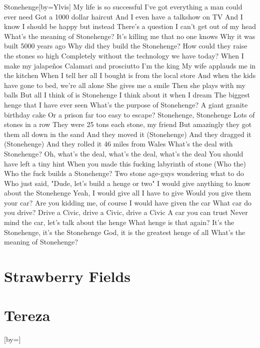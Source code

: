 \documentclass{article}
\begin{document}
\begin{songs}{}
\begin{song}{Stonehenge}[by={Ylvis}]
\beginverse
My life is so successful
I've got everything a man could ever need
Got a 1000 dollar haircut
And I even have a talkshow on TV
And I know I should be happy but instead
There's a question I can't get out of my head
\endverse
\beginverse
What's the meaning of Stonehenge?
It's killing me that no one knows
Why it was built 5000 years ago
Why did they build the Stonehenge?
How could they raise the stones so high
Completely without the technology we have today?
\endverse
\beginverse
When I make my jalapeños
Calamari and prosciutto I'm the king
My wife applauds me in the kitchen
When I tell her all I bought is from the local store
And when the kids have gone to bed, we're all alone
She gives me a smile
Then she plays with my balls
\endverse
\beginverse
But all I think of is Stonehenge
I think about it when I dream
The biggest henge that I have ever seen
What's the purpose of Stonehenge?
A giant granite birthday cake
Or a prison far too easy to escape?
\endverse
\beginverse
Stonehenge, Stonehenge
Lots of stones in a row
They were 25 tons each stone, my friend
But amazingly they got them all down in the sand
And they moved it (Stonehenge)
And they dragged it (Stonehenge)
And they rolled it 46 miles from Wales
\endverse
\beginverse
What's the deal with Stonehenge?
Oh, what's the deal, what's the deal, what's the deal
You should have left a tiny hint
When you made this fucking labyrinth of stone (Who the)
Who the fuck builds a Stonehenge?
Two stone age-guys wondering what to do
Who just said, "Dude, let's build a henge or two"
\endverse
\beginverse
I would give anything to know about the Stonehenge
Yeah, I would give all I have to give
Would you give them your car?
Are you kidding me, of course I would have given the car
What car do you drive?
Drive a Civic, drive a Civic, drive a Civic
A car you can trust
Never mind the car, let's talk about the henge
What henge is that again?
It's the Stonehenge, it's the Stonehenge
God, it is the greatest henge of all
What's the meaning of Stonehenge?
\endverse
\end{song}

\section{Strawberry Fields}


\section{Tereza}
\begin{song}{}[by={}]
\beginverse


\end{song}
\end{songs}
\end{document}
